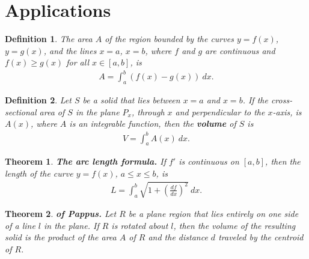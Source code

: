\documentclass{article}
\theoremstyle{sltheorem}
\newtheorem{definition}{Definition}[section]
\newtheorem{theorem}{Theorem}[section]
\begin{document}
\section{Applications}
\begin{definition}
    The area $A$ of the region bounded by the curves $y=f(x)$, $y=g(x)$, and the lines $x=a$, $x=b$, where $f$ and $g$ are continuous and $f(x)\geq g(x)$ for all $x\in[a,b]$, is
    \begin{align*}
        A=\int_a^b \left(f(x)-g(x)\right)\:dx.
    \end{align*}
\end{definition}
\begin{definition}
    Let $S$ be a solid that lies between $x=a$ and $x=b$. If the cross-sectional area of $S$ in the plane $P_x$, through $x$ and perpendicular to the $x$-axis, is $A(x)$, where $A$ is an integrable function, then the \textbf{volume} of $S$ is
    \begin{align*}
        V=\int_a^b A(x)\:dx.
    \end{align*}
\end{definition}
\begin{theorem}
    \textbf{The arc length formula.} If $f'$ is continuous on $[a,b]$, then the length of the curve $y=f(x)$, $a\leq x \leq b$, is
    \begin{align*}
        L = \int_a^b \sqrt{1+\left(\frac{df}{dx}\right)^2}\:dx.
    \end{align*}
\end{theorem}
\begin{theorem}
    \textbf{of Pappus.} Let $R$ be a plane region that lies entirely on one side of a line $l$ in the plane. 
    If $R$ is rotated about $l$, then the volume of the resulting solid is the product of the area $A$ of $R$ and the distance $d$ traveled by the centroid of $R$.
\end{theorem}
\end{document}
